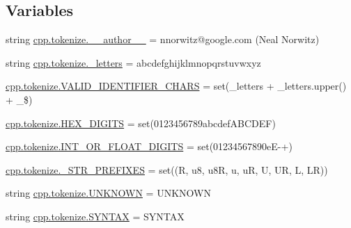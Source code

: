\subsection*{Variables}
\begin{DoxyCompactItemize}
\item 
string \mbox{\hyperlink{namespacecpp_1_1tokenize_a13ec118ce7f7df6ecd18b3c74d37708a}{cpp.\+tokenize.\+\_\+\+\_\+author\+\_\+\+\_\+}} = \textquotesingle{}nnorwitz@google.\+com (Neal Norwitz)\textquotesingle{}
\item 
string \mbox{\hyperlink{namespacecpp_1_1tokenize_ab5a9d36b61d51e76473c383db9e4b934}{cpp.\+tokenize.\+\_\+letters}} = \textquotesingle{}abcdefghijklmnopqrstuvwxyz\textquotesingle{}
\item 
\mbox{\hyperlink{namespacecpp_1_1tokenize_a733f1cf605b1630fb6a0a7f30aaefbec}{cpp.\+tokenize.\+V\+A\+L\+I\+D\+\_\+\+I\+D\+E\+N\+T\+I\+F\+I\+E\+R\+\_\+\+C\+H\+A\+RS}} = set(\+\_\+letters + \+\_\+letters.\+upper() + \textquotesingle{}\+\_\$\textquotesingle{})
\item 
\mbox{\hyperlink{namespacecpp_1_1tokenize_a8b45b0f0f2b504757e9ede9c342b2c36}{cpp.\+tokenize.\+H\+E\+X\+\_\+\+D\+I\+G\+I\+TS}} = set(\textquotesingle{}0123456789abcdef\+A\+B\+C\+D\+E\+F\textquotesingle{})
\item 
\mbox{\hyperlink{namespacecpp_1_1tokenize_ad8c6dd06d4e6ef2e24e9186acb0aff43}{cpp.\+tokenize.\+I\+N\+T\+\_\+\+O\+R\+\_\+\+F\+L\+O\+A\+T\+\_\+\+D\+I\+G\+I\+TS}} = set(\textquotesingle{}01234567890e\+E-\/+\textquotesingle{})
\item 
\mbox{\hyperlink{namespacecpp_1_1tokenize_aef952930004258aec982a51c8875e82a}{cpp.\+tokenize.\+\_\+\+S\+T\+R\+\_\+\+P\+R\+E\+F\+I\+X\+ES}} = set((\textquotesingle{}R\textquotesingle{}, \textquotesingle{}u8\textquotesingle{}, \textquotesingle{}u8R\textquotesingle{}, \textquotesingle{}u\textquotesingle{}, \textquotesingle{}uR\textquotesingle{}, \textquotesingle{}U\textquotesingle{}, \textquotesingle{}UR\textquotesingle{}, \textquotesingle{}L\textquotesingle{}, \textquotesingle{}LR\textquotesingle{}))
\item 
string \mbox{\hyperlink{namespacecpp_1_1tokenize_a0dfd65c08216eed29f74a64b603ac540}{cpp.\+tokenize.\+U\+N\+K\+N\+O\+WN}} = \textquotesingle{}U\+N\+K\+N\+O\+WN\textquotesingle{}
\item 
string \mbox{\hyperlink{namespacecpp_1_1tokenize_a1655e62b60899059935930c81ba25c01}{cpp.\+tokenize.\+S\+Y\+N\+T\+AX}} = \textquotesingle{}S\+Y\+N\+T\+AX\textquotesingle{}
\item 

\end{DoxyCompactItemize}
